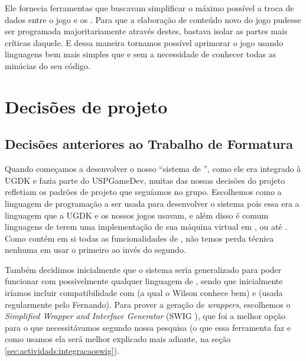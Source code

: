 
    Ele fornecia ferramentas que buscavam simplificar o máximo possível a
    troca de dados entre o jogo e os . Para que a elaboração de conteúdo
    novo do jogo pudesse ser programada majoritariamente através destes, bastava
    isolar as partes mais críticas daquele. E dessa maneira tornamos possível
    aprimorar o jogo usando linguagens bem mais simples que \CXX{} e sem a
    necessidade de conhecer todas as minúcias do seu código.


  \section{Decisões de projeto}
  \label{sec:actividads:decisoes}

  \subsection{Decisões anteriores ao Trabalho de Formatura}
  Quando começamos a desenvolver o nosso ``sistema de '',
  como ele era integrado à UGDK e fazia parte do USPGameDev, muitas das
  nossas decisões do projeto refletiam os padrões de projeto que seguíamos
  no grupo. Escolhemos \CXX{} como a linguagem de programação a ser usada
  para desenvolver o sistema pois essa era a linguagem que a UGDK e os nossos
  jogos usavam, e além disso é comum linguagens de \script{} terem uma
  implementação de sua máquina virtual em \C{}, ou até \CXX{}. Como \CXX{}
  contém em si todas as funcionalidades de \C{}, não temos perda técnica nenhuma
  em usar o primeiro ao invés do segundo.
  
  Também decidimos inicialmente que o sistema seria generalizado para poder
  funcionar com possivelmente qualquer linguagem de \script{}, sendo que
  inicialmente iríamos incluir compatibilidade com  (a qual o Wilson conhece
  bem) e  (usada regularmente pelo Fernando). Para prover a geração de 
  \textit{wrappers}, escolhemos o \emph{Simplified Wrapper and Interface Generator} 
  (SWIG \cite{swig:00}), que foi a melhor opção para o que 
  necessitávamos segundo nossa pesquisa (o que essa ferramenta faz e como
  usamos ela será melhor explicado mais adiante, na seção \ref{sec:actividads:integracaoswig}).
  
